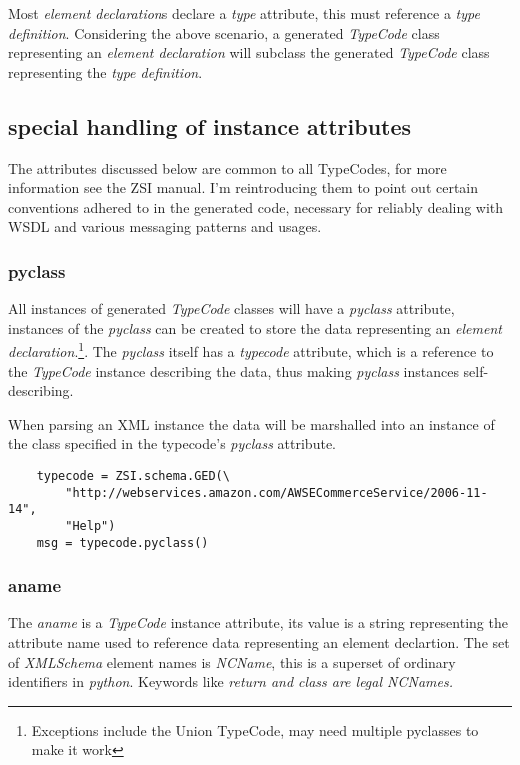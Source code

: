 Most {\it element declaration}s declare a {\it type} attribute, this must
reference a {\it type definition}.  Considering the above scenario, a
generated {\it TypeCode} class representing an {\it element declaration} will
subclass the generated {\it TypeCode} class representing the {\it type
definition}.

\subsection{special handling of instance attributes}
The attributes discussed below are common to all TypeCodes, for more information
see the ZSI manual.  I'm reintroducing them to point out certain conventions
adhered to in the generated code, necessary for reliably dealing with WSDL and
various messaging patterns and usages.

\subsubsection{pyclass}
All instances of generated {\it TypeCode} classes will have a {\it pyclass}
attribute, instances of the {\it pyclass} can be created to store the data
representing an {\it element declaration}.\footnote{Exceptions include the
Union TypeCode, may need multiple pyclasses to make it work}. The {\it pyclass}
itself has a {\it typecode} attribute, which is a reference to
the {\it TypeCode} instance describing the data, thus making {\it pyclass}
instances self-describing.

When parsing an XML instance the data will be marshalled into an instance of the
class specified in the typecode's {\it pyclass} attribute.

\begin{verbatim}
    typecode = ZSI.schema.GED(\
        "http://webservices.amazon.com/AWSECommerceService/2006-11-14",
        "Help")
    msg = typecode.pyclass()
\end{verbatim}
\par

\subsubsection{aname}
The {\it aname} is a {\it TypeCode} instance attribute, its value is a string
representing  the attribute name used to reference data representing an element
declartion. The set  of {\it XMLSchema} element names is {\it NCName}, this is
a superset of ordinary identifiers in {\it python}. Keywords like \it{return}
and \it{class} are legal NCNames.

